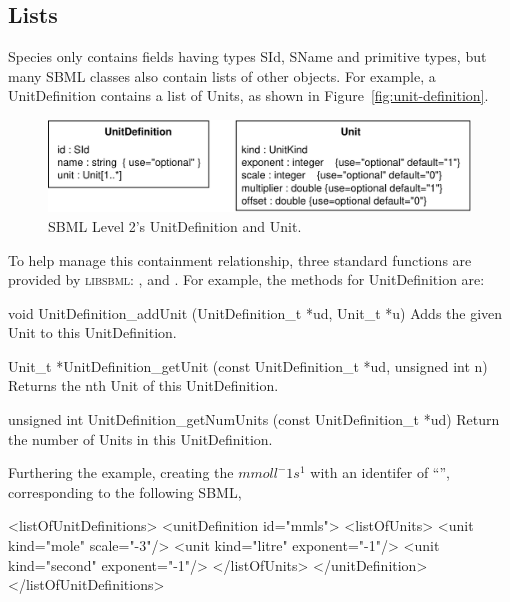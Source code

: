 \documentclass{sbmlmanual}
\newcommand{\libsbml}{\textsc{libsbml}}
\begin{document}
\subsection{Lists}
\label{sec:lists}

Species only contains fields having types SId, SName and primitive types,
but many SBML classes also contain lists of other objects.  For example, a
UnitDefinition contains a list of Units, as shown in
Figure~\vref{fig:unit-definition}.

\begin{figure}[htb]
  \centering
  \includegraphics[scale=0.68]{unitdefinition}
  \caption{SBML Level 2's UnitDefinition and Unit.}
  \label{fig:unit-definition}
\end{figure}

To help manage this containment relationship, three standard functions are
provided by \libsbml{}: ,  and
.  For example, the methods for UnitDefinition
are:


\begin{methoddef}{void UnitDefinition\_addUnit (UnitDefinition\_t *ud,
Unit\_t *u)}
  Adds the given Unit to this UnitDefinition.
\end{methoddef}

\begin{methoddef}{Unit\_t *UnitDefinition\_getUnit (const UnitDefinition\_t
*ud, unsigned int n)}
Returns the nth Unit of this UnitDefinition.
\end{methoddef}

\begin{methoddef}{unsigned int UnitDefinition\_getNumUnits (const
UnitDefinition\_t *ud)}
  Return the number of Units in this UnitDefinition.
\end{methoddef}


Furthering the example, creating the  $mmol l^-1
s^1$ with an identifer of ``'', corresponding to the following SBML,

\begin{example}
<listOfUnitDefinitions>
  <unitDefinition id="mmls">
    <listOfUnits>
      <unit kind="mole"   scale="-3"/>
      <unit kind="litre"  exponent="-1"/>
      <unit kind="second" exponent="-1"/>
    </listOfUnits>
  </unitDefinition>
</listOfUnitDefinitions>
\end{example}
\end{document}
